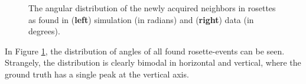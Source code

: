 \begin{figure}[H]
    \centering
    \caption{The angular distribution of the newly acquired neighbors in rosettes as found in (\textbf{left}) simulation (in radians) and (\textbf{right}) data (in degrees).}
    \label{fig:roestte-angle-dist}
    
\end{figure}
In Figure \ref{fig:roestte-angle-dist}, the distribution of angles of all found rosette-events can be seen. Strangely, the distribution is clearly bimodal in horizontal and vertical, where the ground truth has a single peak at the vertical axis. 

